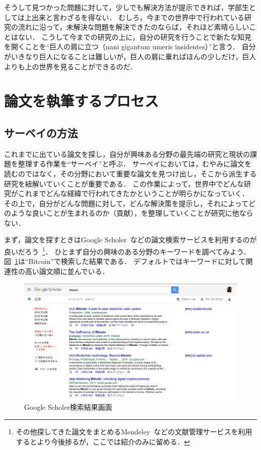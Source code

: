 そうして見つかった問題に対して，少しでも解決方法が提示できれば，学部生としては上出来と言わざるを得ない．
むしろ，今までの世界中で行われている研究の流れに沿って，未解決な問題を解決できたのならば，それほど素晴らしいことはない．
こうして今までの研究の上に，自分の研究を行うことで新たな知見を開くことを``巨人の肩に立つ（nani gigantum umeris insidentes）''と言う．
自分がいきなり巨人になることは難しいが，巨人の肩に乗ればほんの少しだけ，巨人よりも上の世界を見ることができるのだ．

\section{論文を執筆するプロセス}
\label{background:process}

\subsection{サーベイの方法}
\label{backgorund:servey}
これまでに出ている論文を探し，自分が興味ある分野の最先端の研究と現状の課題を整理する作業を``サーベイ''と呼ぶ．
サーベイにおいては，むやみに論文を読むのではなく，その分野において重要な論文を見つけ出し，そこから派生する研究を紐解いていくことが重要である．
この作業によって，世界中でどんな研究がこれまでどんな経緯で行われてきたかということが明らかになっていく．
その上で，自分がどんな問題に対して，どんな解決策を提示し，それによってどのような良いことが生まれるのか（貢献），を整理していくことが研究に他ならない．

まず，論文を探すときはGoogle Scholer~\cite{googlescholer}などの論文検索サービスを利用するのが良いだろう~\footnote{その他探してきた論文をまとめるMendeley~\cite{mendeley}などの文献管理サービスを利用するとより今後捗るが，ここでは紹介のみに留める．}．
ひとまず自分の興味のある分野のキーワードを調べてみよう．
図~\ref{img:scholersearch}は``Bitcoin''で検索した結果である．
デフォルトではキーワードに対して関連性の高い論文順に並んでいる．

\begin{figure}[htb]
    \begin{center}
        \includegraphics[width=450pt]{./img/scholersearch.png}
        \caption{Google Scholer検索結果画面}
        \label{img:scholersearch}
    \end{center}
\end{figure}

